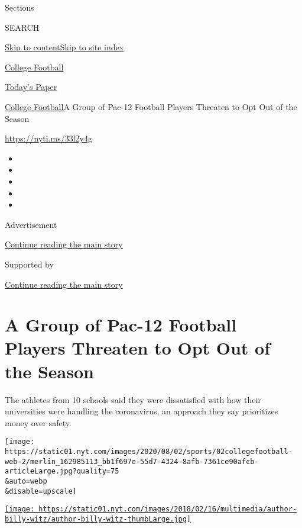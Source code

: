 Sections

SEARCH

\protect\hyperlink{site-content}{Skip to
content}\protect\hyperlink{site-index}{Skip to site index}

\href{https://www.nytimes.com/section/sports/ncaafootball}{College
Football}

\href{https://myaccount.nytimes.com/auth/login?response_type=cookie\&client_id=vi}{}

\href{https://www.nytimes.com/section/todayspaper}{Today's Paper}

\href{/section/sports/ncaafootball}{College Football}\textbar{}A Group
of Pac-12 Football Players Threaten to Opt Out of the Season

\url{https://nyti.ms/33l2y4g}

\begin{itemize}
\item
\item
\item
\item
\item
\end{itemize}

Advertisement

\protect\hyperlink{after-top}{Continue reading the main story}

Supported by

\protect\hyperlink{after-sponsor}{Continue reading the main story}

\hypertarget{a-group-of-pac-12-football-players-threaten-to-opt-out-of-the-season}{%
\section{A Group of Pac-12 Football Players Threaten to Opt Out of the
Season}\label{a-group-of-pac-12-football-players-threaten-to-opt-out-of-the-season}}

The athletes from 10 schools said they were dissatisfied with how their
universities were handling the coronavirus, an approach they say
prioritizes money over safety.

\texttt{[image: https://static01.nyt.com/images/2020/08/02/sports/02collegefootball-web-2/merlin\_162985113\_bb1f697e-55d7-4324-8afb-7361ce90afcb-articleLarge.jpg?quality=75\\\&auto=webp\\\&disable=upscale]}

\href{https://www.nytimes.com/by/billy-witz}{\texttt{[image: https://static01.nyt.com/images/2018/02/16/multimedia/author-billy-witz/author-billy-witz-thumbLarge.jpg]}}

